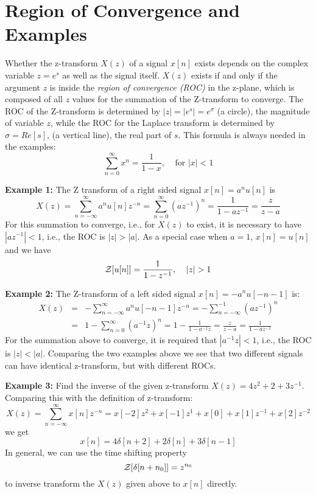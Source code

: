
\newpage
\section*{Region of Convergence and Examples}

Whether the z-transform $X(z)$ of a signal $x[n]$ exists depends on the 
complex variable $z=e^s$ as well as the signal itself. $X(z)$ exists if 
and only if the argument $z$ is inside the {\em region of convergence 
(ROC)} in the z-plane, which is composed of all $z$ values for the
summation of the Z-transform to converge. The ROC of the Z-transform is 
determined by $|z|=|e^s|=e^{\sigma}$ (a circle), the magnitude of variable
$z$, while the ROC for the Laplace transform is determined by $\sigma=Re[s]$,
(a vertical line), the real part of $s$. This formula is always needed in 
the examples:
\[	\sum_{n=0}^\infty x^n=\frac{1}{1-x},\;\;\;\;\mbox{for $|x|<1$} \]

{\bf Example 1:} The Z transform of a right sided signal $x[n]=a^n u[n]$ is
\[	X(z)=\sum_{n=-\infty}^\infty a^n u[n] z^{-n}
	=\sum_{n=0}^\infty (az^{-1})^n=\frac{1}{1-az^{-1}}=\frac{z}{z-a} \]
For this summation to converge, i.e., for $X(z)$ to exist, it is necessary
to have $| az^{-1} |<1$, i.e., the ROC is $|z| > |a|$. As a special case when
$a=1$, $x[n]=u[n]$ and we have
\[	{\cal Z}[u[n]]=\frac{1}{1-z^{-1}}, \;\;\;\;|z|>1	\]

{\bf Example 2:} The Z-transform of a left sided signal $x[n]=-a^nu[-n-1]$ is:
\begin{eqnarray}
X(z) &=& -\sum_{n=-\infty}^\infty a^nu[-n-1]z^{-n}=-\sum_{n=-\infty}^{-1} (az^{-1})^n
	\nonumber \\
 &=& 1-\sum_{n=0}^\infty (a^{-1}z)^n=1-\frac{1}{1-a^{-1}z}=\frac{z}{z-a}=\frac{1}{1-az^{-1}}
	\nonumber
\end{eqnarray}
For the summation above to converge, it is required that $|a^{-1}z|<1$, i.e.,
the ROC is $|z|<|a|$. Comparing the two examples above we see that two different
signals can have identical z-transform, but with different ROCs. 

{\bf Example 3: } Find the inverse of the given z-transform $X(z)=4z^2+2+3z^{-1}$.
Comparing this with the definition of z-transform:
\[
X(z)=\sum_{n=-\infty}^\infty x[n]z^{-n}=x[-2]z^2+x[-1]z^1+x[0]+x[1]z^{-1}+x[2]z^{-2}
\]
we get
\[	x[n]=4\delta[n+2]+2\delta[n]+3\delta[n-1]	\]
In general, we can use the time shifting property
\[	{\cal Z}[\delta[n+n_0]]=z^{n_0}	\]
to inverse transform the $X(z)$ given above to $x[n]$ directly.

